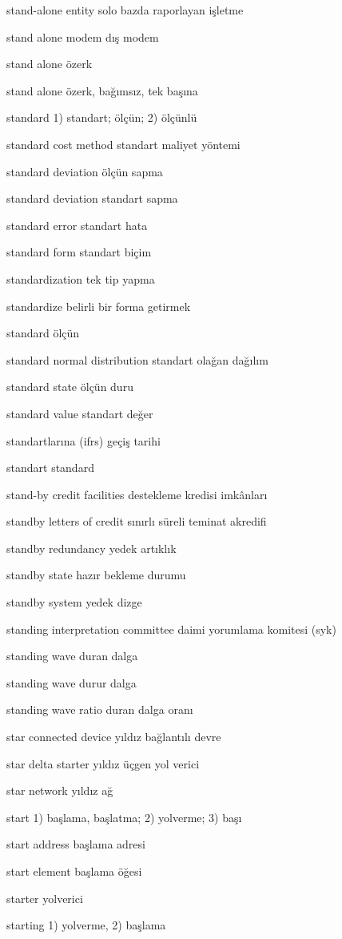 \documentclass[12pt,fleqn]{article}\usepackage{../../common}
\begin{document}
stand-alone entity solo bazda raporlayan işletme

stand alone modem dış modem

stand alone özerk

stand alone özerk, bağımsız, tek başına

standard 1) standart; ölçün; 2) ölçünlü

standard cost method standart maliyet yöntemi

standard deviation ölçün sapma

standard deviation standart sapma

standard error standart hata

standard form standart biçim

standardization tek tip yapma

standardize belirli bir forma getirmek

standard ölçün

standard normal distribution standart olağan dağılım

standard state ölçün duru

standard value standart değer

standartlarına (ifrs) geçiş tarihi

standart standard

stand-by credit facilities destekleme kredisi imkânları

standby letters of credit sınırlı süreli teminat akredifi

standby redundancy yedek artıklık

standby state hazır bekleme durumu

standby system yedek dizge

standing interpretation committee daimi yorumlama komitesi (syk)

standing wave duran dalga

standing wave durur dalga

standing wave ratio duran dalga oranı

star connected device yıldız bağlantılı devre

star delta starter yıldız üçgen yol verici

star network yıldız ağ

start 1) başlama, başlatma; 2) yolverme; 3) başı

start address başlama adresi

start element başlama öğesi

starter yolverici

starting 1) yolverme, 2) başlama
\end{document}
